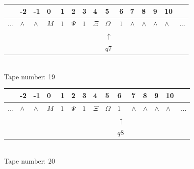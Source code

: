 \documentclass[11pt]{article}
\begin{document}
\begin{table}[H]
\centering
\begin{tabular}{lllllllllllllll}
 & -2 & -1 & 0 & 1 & 2 & 3 & 4 & 5 & 6 & 7 & 8 & 9 & 10 & \\
\hline
$...$ & \multicolumn{1}{|l|}{$\wedge$} & \multicolumn{1}{|l|}{$\wedge$} & \multicolumn{1}{|l|}{$M$} & \multicolumn{1}{|l|}{$1$} & \multicolumn{1}{|l|}{$\Psi$} & \multicolumn{1}{|l|}{$1$} & \multicolumn{1}{|l|}{$\Xi$} & \multicolumn{1}{|l|}{$\Omega$} & \multicolumn{1}{|l|}{$1$} & \multicolumn{1}{|l|}{$\wedge$} & \multicolumn{1}{|l|}{$\wedge$} & \multicolumn{1}{|l|}{$\wedge$} & \multicolumn{1}{|l|}{$\wedge$} & $...$\\
\hline
&  &  &  &  &  &  &  & $\uparrow$ &  &  &  &  &  &  \\
&  &  &  &  &  &  &  & $ q7 $ &  &  &  &  &  &  \\
\end{tabular}
\\
Tape number: 19
\noindent\makebox[\linewidth]{\hdashrule{\textwidth}{1pt}{1pt}}\end{table}

\begin{table}[H]
\centering
\begin{tabular}{lllllllllllllll}
 & -2 & -1 & 0 & 1 & 2 & 3 & 4 & 5 & 6 & 7 & 8 & 9 & 10 & \\
\hline
$...$ & \multicolumn{1}{|l|}{$\wedge$} & \multicolumn{1}{|l|}{$\wedge$} & \multicolumn{1}{|l|}{$M$} & \multicolumn{1}{|l|}{$1$} & \multicolumn{1}{|l|}{$\Psi$} & \multicolumn{1}{|l|}{$1$} & \multicolumn{1}{|l|}{$\Xi$} & \multicolumn{1}{|l|}{$\Omega$} & \multicolumn{1}{|l|}{$1$} & \multicolumn{1}{|l|}{$\wedge$} & \multicolumn{1}{|l|}{$\wedge$} & \multicolumn{1}{|l|}{$\wedge$} & \multicolumn{1}{|l|}{$\wedge$} & $...$\\
\hline
&  &  &  &  &  &  &  &  & $\uparrow$ &  &  &  &  &  \\
&  &  &  &  &  &  &  &  & $ q8 $ &  &  &  &  &  \\
\end{tabular}
\\
Tape number: 20
\noindent\makebox[\linewidth]{\hdashrule{\textwidth}{1pt}{1pt}}\end{table}
\end{document}
